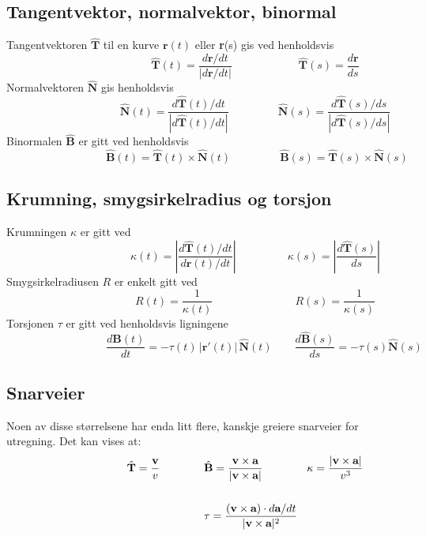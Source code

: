 \documentclass[fleqn,12pt]{wlscirep}
\begin{document}
\subsection{Tangentvektor, normalvektor, binormal}
Tangentvektoren $\hat{\textbf{T}}$ til en kurve $\textbf{r}(t)$ eller \textbf{r}(s) gis ved henholdsvis
\begin{equation}
    \qquad \qquad \qquad \qquad \quad \hat{\textbf{T}}(t) = \frac{d\textbf{r}/dt}{\left|d\textbf{r}/dt\right|}\qquad\qquad\qquad \hat{\textbf{T}}(s) = \frac{d\textbf{r}}{ds} 
\end{equation}
Normalvektoren $\hat{\textbf{N}}$ gis henholdsvis 
\begin{equation}
    \qquad \qquad \qquad \qquad \quad \hat{\textbf{N}}(t) = \frac{d\hat{\textbf{T}}(t)/dt}{\left|d\hat{\textbf{T}}(t)/dt\right|}\qquad\qquad\: \ \hat{\textbf{N}} (s) = \frac{d\hat{\textbf{T}}(s)/ds}{\left|d\hat{\textbf{T}}(s)/ds\right|}
\end{equation}
Binormalen $\hat{\textbf{B}}$ er gitt ved henholdsvis
\begin{equation}
    \qquad \qquad \qquad \qquad \quad \hat{\textbf{B}}(t) = \hat{\textbf{T}}(t)\times \hat{\textbf{N}}(t)\qquad\qquad\: \ \hat{\textbf{B}} (s) = \hat{\textbf{T}}(s) \times \hat{\textbf{N}} (s)
\end{equation}
\subsection{Krumning, smygsirkelradius og torsjon}
Krumningen $\kappa$ er gitt ved
\begin{equation}
   \qquad \qquad \qquad \qquad \quad \kappa(t) =  \left|\frac{d\hat{\textbf{T}}(t)/dt}{d\textbf{r}(t)/dt}\right| \qquad\qquad\: \ \ \kappa (s) = \left|\frac{d \hat{\textbf{T}}(s)}{ds}\right|
\end{equation}
Smygsirkelradiusen $R$ er enkelt gitt ved 
\begin{equation}
  \qquad \qquad \qquad \qquad \quad R(t) = \frac{1}{\kappa(t)} \qquad\qquad\qquad \quad \ \ R(s) = \frac{1}{\kappa(s)}
\end{equation}
Torsjonen $\tau$ er gitt ved henholdsvis ligningene
\begin{equation}
    \qquad \qquad \qquad \qquad \quad \frac{d\hat{\textbf{B}}(t)}{dt} = -\tau (t)\, |\textbf{r}'(t)|\,\hat{\textbf{N}} (t)\qquad \frac{d\hat{\textbf{B}}(s)}{ds} = -\tau(s) \hat{\textbf{N}}(s)
\end{equation}
\subsection{Snarveier}
Noen av disse størrelsene har enda litt flere, kanskje greiere snarveier for utregning. Det kan vises at: 
\begin{align}
    \qquad\qquad \qquad \quad \:\hat{\textbf{T}} = \frac{\textbf{v}}{v} \qquad\qquad &\hat{\textbf{B}} = \frac{\textbf{v}\times\textbf{a}}{|\textbf{v}\times\textbf{a}|} \qquad \qquad \kappa =  \frac{|\textbf{v}\times\textbf{a}|}{v^3}\\ \notag \\
    & \tau = \frac{(\textbf{v}\times\textbf{a})\cdot d\textbf{a}/dt}{|\textbf{v}\times\textbf{a}|^2}
\end{align}
\end{document}
